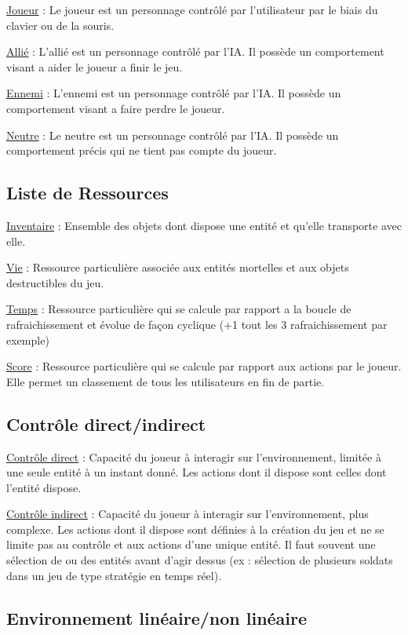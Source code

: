 \underline{Joueur} :
Le joueur est un personnage contrôlé par l'utilisateur par le biais du clavier ou de la souris.

\underline{Allié} :
L'allié est un personnage contrôlé par l'IA. Il possède un comportement visant a aider le joueur a finir le jeu.

\underline{Ennemi} :
L'ennemi est un personnage contrôlé par l'IA. Il possède un comportement visant a faire perdre le joueur.

\underline{Neutre} :
Le neutre est un personnage contrôlé par l'IA. Il possède un comportement précis qui ne tient pas compte du joueur.


\subsection*{Liste de Ressources}


\underline{Inventaire} : 
Ensemble des objets dont dispose une entité et qu'elle transporte avec elle.

\underline{Vie} : 
Ressource particulière associée aux entités mortelles et aux objets destructibles du jeu.

\underline{Temps} :
Ressource particulière qui se calcule par rapport a la boucle de rafraichissement et évolue de façon cyclique (+1 tout les 3 rafraichissement par exemple)

\underline{Score} :
Ressource particulière qui se calcule par rapport aux actions par le joueur. Elle permet un classement de tous les utilisateurs en fin de partie.

\subsection*{Contrôle direct/indirect}

\underline{Contrôle direct} :
Capacité du joueur à interagir sur l’environnement, limitée à une seule entité à un instant donné. 
Les actions dont il dispose sont celles dont l'entité dispose.

\underline{Contrôle indirect} :
Capacité du joueur à interagir sur l’environnement, plus complexe. 
Les actions dont il dispose sont définies à la création du jeu et ne se limite pas au contrôle et aux actions d'une unique entité.
Il faut souvent une sélection de ou des entités avant d'agir dessus (ex : sélection de plusieurs soldats dans un jeu de type stratégie en temps réel).

\subsection*{Environnement linéaire/non linéaire}

